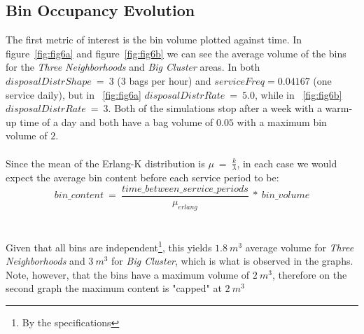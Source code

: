 \documentclass{article}
\begin{document}
		\subsection{Bin Occupancy Evolution}
		The first metric of interest is the bin volume plotted against time. In figure~\ref{fig:fig6a} and figure~\ref{fig:fig6b} we
		can see the average volume of the bins for the \textit{Three Neighborhoods} and \textit{Big Cluster} areas. In both
		$disposalDistrShape\ =\ 3$ (3 bags per hour) and $serviceFreq = 0.04167$ (one service daily), but in ~\ref{fig:fig6a}
		$disposalDistrRate\ = \ 5.0$, while in ~\ref{fig:fig6b} $disposalDistrRate\ =\ 3$. Both of the simulations stop after
		a week with a warm-up time of a day and both have a bag volume of $0.05$ with a maximum bin volume of $2$.
		\\
		\\
		Since the mean of the Erlang-K distribution is $\mu\ =\ \frac{k}{\lambda}$, in each case we would expect the average bin content
		before each service period to be:
    	\begin{equation}
			bin\_content\ =\ \frac{time\_between\_service\_periods}{\mu_{erlang}}\ *\ bin\_volume
		\end{equation}
		\\
		\\
		Given that all bins are independent\footnote{By the specifications}, this yields $1.8\ m^3$ average volume for \textit{Three Neighborhoods}
		and $3\ m^3$ for \textit{Big Cluster}, which is what is observed in the graphs. Note, however, that the bins have a maximum volume of
		$2\ m^3$, therefore on the second graph the maximum content is "capped" at $2\ m^3$
\end{document}
